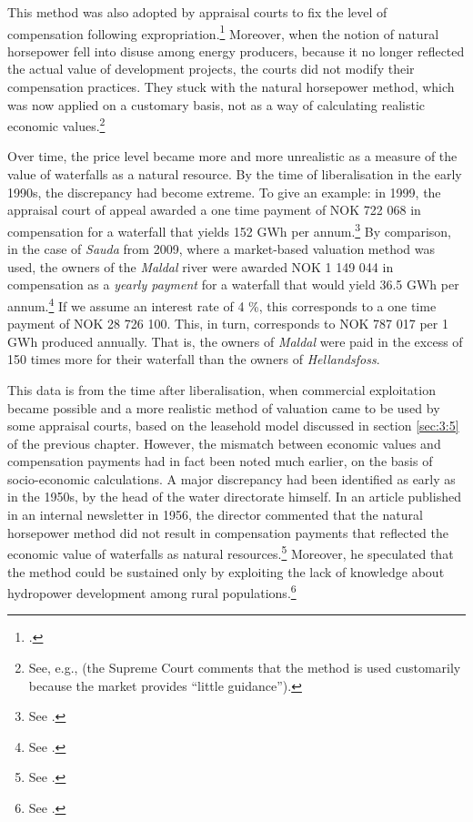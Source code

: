 This method was also adopted by appraisal courts to fix the level of compensation following expropriation.\footnote{\cite[521]{vislie02}.} Moreover, when the notion of natural horsepower fell into disuse among energy producers, because it no longer reflected the actual value of development projects, the courts did not modify their compensation practices. They stuck with the natural horsepower method, which was now applied on a customary basis, not as a way of calculating realistic economic values.\footnote{See, e.g., \cite[1599]{hellandsfoss99} (the Supreme Court comments that the method is used customarily because the market provides ``little guidance'').}

Over time, the price level became more and more unrealistic as a measure of the value of waterfalls as a natural resource. By the time of liberalisation in the early 1990s, the discrepancy had become extreme. To give an example: in 1999, the appraisal court of appeal awarded a one time payment of NOK 722 068 in compensation for a waterfall that yields 152 GWh per annum.\footnote{See \cite{hellandsfoss99}.} By comparison, in the case of {\it Sauda} from 2009, where a market-based valuation method was used, the owners of the {\it Maldal} river were awarded NOK 1 149 044 in compensation as a {\it yearly payment} for a waterfall that would yield 36.5 GWh per annum.\footnote{See \cite{sauda09}.} If we assume an interest rate of 4 \%, this corresponds to a one time payment of NOK 28 726 100. This, in turn, corresponds to NOK 787 017 per 1 GWh produced annually. That is, the owners of {\it Maldal} were paid in the excess of 150 times more for their waterfall than the owners of {\it Hellandsfoss}.

This data is from the time after liberalisation, when commercial exploitation became possible and a more realistic method of valuation came to be used by some appraisal courts, based on the leasehold model discussed in section \ref{sec:3:5} of the previous chapter. However, the mismatch between economic values and compensation payments had in fact been noted much earlier, on the basis of socio-economic calculations. A major discrepancy had been identified as early as in the 1950s, by the head of the water directorate himself. In an article published in an internal newsletter in 1956, the director commented that the natural horsepower method did not result in compensation payments that reflected the economic value of waterfalls as natural resources.\footnote{See \cite{rogstad56}.} Moreover, he speculated that the method could be sustained only by exploiting the lack of knowledge about hydropower development among rural populations.\footnote{See \cite{rogstad56}.}

